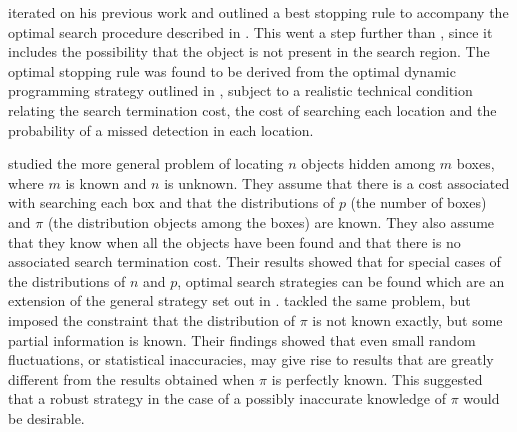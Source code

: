 \cite{Chew1973OptimalProblem} iterated on his previous work \cite{Chew1966AProcedure} and outlined a best stopping rule to accompany the optimal search procedure described in \cite{Chew1966AProcedure}. This went a step further than \cite{Ross1969AStop}, since it includes the possibility that the object is not present in the search region. The optimal stopping rule was found to be derived from the optimal dynamic programming strategy outlined in \cite{Chew1966AProcedure}, subject to a realistic technical condition relating the search termination cost, the cost of searching each location and the probability of a missed detection in each location.

\cite{Kimeldorf1979BinomialObjects} studied the more general problem of locating $n$ objects hidden among $m$ boxes, where $m$ is known and $n$ is unknown. They assume that there is a cost associated with searching each box and that the distributions of $p$ (the number of boxes) and $\pi$ (the distribution objects among the boxes) are known. They also assume that they know when all the objects have been found and that there is no associated search termination cost. Their results showed that for special cases of the distributions of $n$ and $p$, optimal search strategies can be found which are an extension of the general strategy set out in \cite{Blackwell1961DiscreteProgramming}. \cite{Assaf1985OptimalApproach} tackled the same problem, but imposed the constraint that the distribution of $\pi$ is not known exactly, but some partial information is known. Their findings showed that even small random fluctuations, or statistical inaccuracies, may give rise to results that are greatly different from the results obtained when $\pi$ is perfectly known. This suggested that a robust strategy in the case of a possibly inaccurate knowledge of $\pi$ would be desirable.

